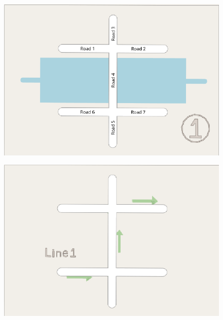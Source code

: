 \documentclass{beamer}
\begin{document}
\begin{frame}
    \begin{figure}[htpb]
        \centering
        \includegraphics[width=1\linewidth]{figure/plot1.png}
    \end{figure}
\end{frame}

\begin{frame}
    \begin{figure}[htpb]
        \centering
        \includegraphics[width=1\linewidth]{figure/line1.png}
    \end{figure}
\end{frame}
\end{document}
